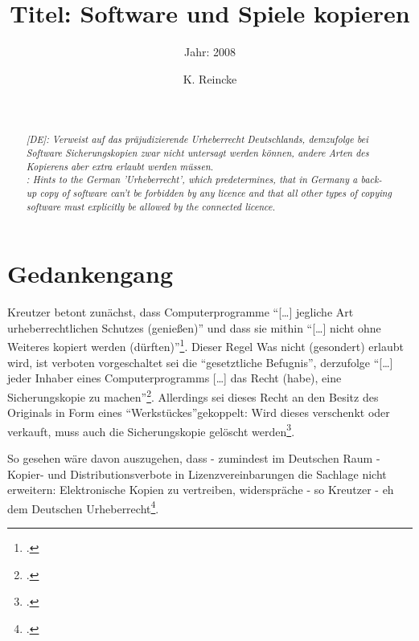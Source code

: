 \documentclass[DIV=calc,BCOR=5mm,11pt,headings=small,oneside,abstract=true, toc=bib]{scrartcl}
\begin{document}

\titlehead{Literaturexzerpt}
\subject{Autor(en): Kreutzer}
\title{Titel: Software und Spiele kopieren}
\subtitle{Jahr: 2008 }
\author{K. Reincke}
\maketitle

\begin{abstract}
\noindent
\cite[(in:)][]{DjoGehGraKreSpi2008a} \\
\noindent
\cite[(ist:)][29 - 33]{Kreutzer2008a} \\
\noindent \itshape
[DE]: Verweist auf das präjudizierende Urheberrecht Deutschlands, demzufolge bei
Software Sicherungskopien zwar nicht untersagt werden können, andere Arten des
Kopierens aber extra erlaubt werden müssen. \\
\noindent
[EN]: Hints to the German ’Urheberrecht’, which predetermines, that in Germany a
back- up copy of software can’t be forbidden by any licence and that all other
types of copying software must explicitly be allowed by the connected licence.
\end{abstract}
\footnotesize
\normalsize

\section{Gedankengang}

Kreutzer betont zunächst, dass Computerprogramme \enquote{[\ldots] jegliche Art
urheberrechtlichen Schutzes (genießen)} und dass sie mithin
\enquote{[\ldots] nicht ohne Weiteres kopiert werden
(dürften)}\footcite[vgl.][29]{Kreutzer2008a}. Dieser Regel \glq{}Was
nicht (gesondert) erlaubt wird, ist verboten\grq{} vorgeschaltet sei die
\enquote{gesetztliche Befugnis}, derzufolge \enquote{[\ldots] jeder Inhaber
eines Computerprogramms [\ldots] das Recht (habe), eine Sicherungskopie zu
machen}\footcite[vgl.][29]{Kreutzer2008a}. Allerdings sei dieses Recht
an den Besitz des Originals in Form eines \enquote{Werkstückes}gekoppelt:
Wird dieses verschenkt oder verkauft, muss auch die Sicherungskopie gelöscht
werden\footcite[vgl.][30]{Kreutzer2008a}.

So gesehen wäre davon auszugehen, dass - zumindest im Deutschen Raum - Kopier-
und Distributionsverbote in Lizenzvereinbarungen die Sachlage nicht erweitern:
Elektronische Kopien zu vertreiben, widerspräche - so Kreutzer - eh dem
Deutschen Urheberrecht\footcite[vgl. dazu][30]{Kreutzer2008a}.
\end{document}
